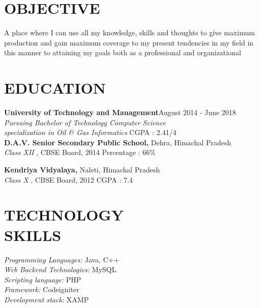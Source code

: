 \documentclass[margin, ]{res} %
\begin{document}
\begin{resume}

 
\section{OBJECTIVE}  

A place where I can use all my knowledge, skills and thoughts to give maximum production and gain maximum coverage to my present tendencies in my field in this manner to attaining my goals both as a professional and organizational 



\section{EDUCATION}
\textbf{University of Technology and Management}\hfill August 2014 - June 2018\\
{\sl Pursuing Bachelor of Technology Computer Science\\ 
specialization in Oil \& Gas Informatics}  \hfill CGPA : 2.41/4 \\


\textbf{D.A.V. Senior Secondary Public School, } Dehra, Himachal Pradesh\\
{\sl Class XII }, CBSE Board, 2014 \hfill
Percentage : 66\%

\textbf{Kendriya Vidyalaya, } Naleti, Himachal Pradesh \\
{\sl Class X }, CBSE Board, 2012 \hfill
CGPA : 7.4




\section{TECHNOLOGY \\ SKILLS} 

{\sl Programming Languages:} Java, C++ \\
{\sl Web Backend Technologies:} MySQL \\
{\sl Scripting language:} PHP \\
{\sl Framework:} Codeigniter \\
{\sl Development stack:} XAMP \\


\end{resume}
\end{document}
